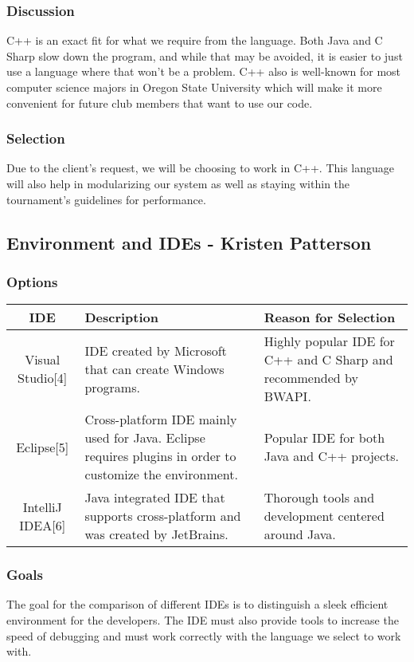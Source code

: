 \subsubsection{Discussion}
C++ is an exact fit for what we require from the language. Both Java and C Sharp slow down the program, and while that may be avoided, it is easier to just use a language where that won't be a problem. C++ also is well-known for most computer science majors in Oregon State University which will make it more convenient for future club members that want to use our code.

\subsubsection{Selection}
Due to the client's request, we will be choosing to work in C++. This language will also help in modularizing our system as well as staying within the tournament's guidelines for performance.

\subsection{Environment and IDEs - Kristen Patterson}
\subsubsection{Options}
\begin{center}
\begin{tabular}{ ||C|L|L|| } 
\hline
IDE & Description & Reason for Selection \\
 \hline
 Visual Studio[4] & IDE created by Microsoft that can create Windows programs.  & Highly popular IDE for C++ and C Sharp and recommended by BWAPI. \\ 
 \hline
 Eclipse[5] & Cross-platform IDE mainly used for Java. Eclipse requires plugins in order to customize the environment. & Popular IDE for both Java and C++ projects. \\ 
 \hline
 IntelliJ IDEA[6] & Java integrated IDE that supports cross-platform and was created by JetBrains.
 & Thorough tools and development centered around Java. \\ 
 \hline
\end{tabular}
\end{center}

\subsubsection{Goals}
The goal for the comparison of different IDEs is to distinguish a sleek efficient environment for the developers. The IDE must also provide tools to increase the speed of debugging and must work correctly with the language we select to work with.

